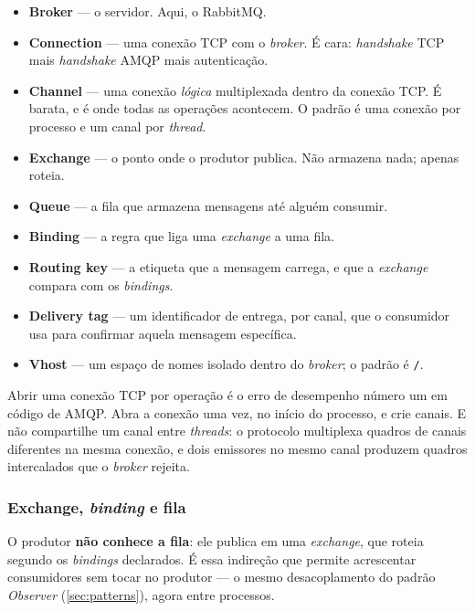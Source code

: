 \begin{itemize}
  \item \textbf{Broker} --- o servidor. Aqui, o RabbitMQ.
  \item \textbf{Connection} --- uma conexão TCP com o \emph{broker}. É cara:
        \emph{handshake} TCP mais \emph{handshake} AMQP mais autenticação.
  \item \textbf{Channel} --- uma conexão \emph{lógica} multiplexada dentro da
        conexão TCP. É barata, e é onde todas as operações acontecem. O padrão
        é uma conexão por processo e um canal por \emph{thread}.
  \item \textbf{Exchange} --- o ponto onde o produtor publica. Não armazena
        nada; apenas roteia.
  \item \textbf{Queue} --- a fila que armazena mensagens até alguém consumir.
  \item \textbf{Binding} --- a regra que liga uma \emph{exchange} a uma fila.
  \item \textbf{Routing key} --- a etiqueta que a mensagem carrega, e que a
        \emph{exchange} compara com os \emph{bindings}.
  \item \textbf{Delivery tag} --- um identificador de entrega, por canal, que o
        consumidor usa para confirmar aquela mensagem específica.
  \item \textbf{Vhost} --- um espaço de nomes isolado dentro do \emph{broker};
        o padrão é \texttt{/}.
\end{itemize}

\begin{regra}
Abrir uma conexão TCP por operação é o erro de desempenho número um em código
de AMQP. Abra a conexão uma vez, no início do processo, e crie canais. E não
compartilhe um canal entre \emph{threads}: o protocolo multiplexa quadros de
canais diferentes na mesma conexão, e dois emissores no mesmo canal produzem
quadros intercalados que o \emph{broker} rejeita.
\end{regra}

\subsubsection{Exchange, \emph{binding} e fila}

O produtor \textbf{não conhece a fila}: ele publica em uma \emph{exchange}, que
roteia segundo os \emph{bindings} declarados. É essa indireção que permite
acrescentar consumidores sem tocar no produtor --- o mesmo desacoplamento do
padrão \emph{Observer} (\cref{sec:patterns}), agora entre processos.

